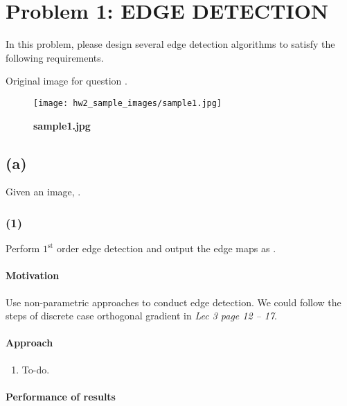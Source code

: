 \section{Problem 1: EDGE DETECTION}\label{problem-1-edge-detection}
In this problem, please design several edge detection algorithms to satisfy the following requirements.

Original image  for question .
\begin{figure}
    \centering
    \texttt{[image: hw2\_sample\_images/sample1.jpg]}
    \caption{\textbf{sample1.jpg}}
    \label{sample1}
\end{figure}

\subsection{(a)}\label{1_a}
Given an image, .

\subsubsection{(1)}
Perform $1^{\mbox{st}}$ order edge detection and output the edge maps as .

\paragraph{Motivation}
Use non-parametric approaches to conduct edge detection. We could follow the steps of discrete case orthogonal gradient in \textit{Lec 3 page 12 -- 17}.

\paragraph{Approach}
\begin{enumerate}
    \item To-do.
\end{enumerate}

\paragraph{Performance of results}

